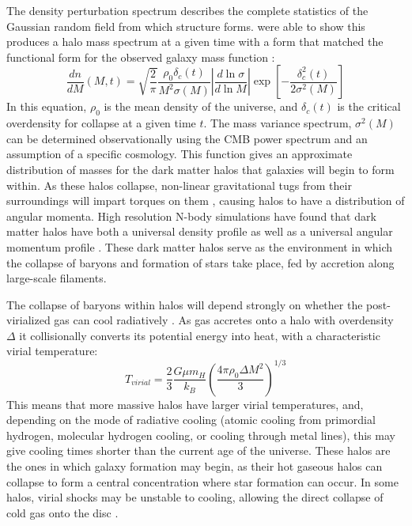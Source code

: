 The density perturbation spectrum describes the complete statistics of the
Gaussian random field from which structure forms. \citet{Press1974} were able to
show this produces a halo mass spectrum at a given time with a form that matched
the functional form for the observed galaxy mass function
\citet{Schechter1976}:
\begin{equation}
    \frac{dn}{dM}(M,t) =
    \sqrt{\frac{2}{\pi}}\frac{\rho_0\delta_c(t)}{M^2\sigma(M)} 
    \left\lvert\frac{d\ln{\sigma}}{d\ln{M}}\right\rvert
    \exp{\left[-\frac{\delta^2_c(t)}{2\sigma^2(M)}\right]}
\end{equation}
In this equation, $\rho_0$ is the mean density of the universe, and
$\delta_c(t)$ is the critical overdensity for collapse at a given time $t$.  The
mass variance spectrum, $\sigma^2(M)$ can be determined observationally using
the CMB power spectrum \citep{Fixsen1996,Spergel2003,Planck2015} and an
assumption of a specific cosmology.  This function gives an approximate
distribution of masses for the dark matter halos that galaxies will begin to
form within.  As these halos collapse, non-linear gravitational tugs from their
surroundings will impart torques on them \citep{Barnes1987}, causing halos to
have a distribution of angular momenta.  High resolution N-body simulations have
found that dark matter halos have both a universal density profile
\citep{Navarro1996,Merritt2006} as well as a universal angular momentum profile
\citep{Bullock2001}.  These dark matter halos serve as the environment in
which the collapse of baryons and formation of stars take place, fed by
accretion along large-scale filaments.

The collapse of baryons within halos will depend strongly on whether the
post-virialized gas can cool radiatively \citep{Rees1977}.  As gas accretes onto
a halo with overdensity $\Delta$ it collisionally converts its potential energy
into heat, with a characteristic virial temperature:
\begin{equation}
    T_{virial} = \frac{2}{3}\frac{G\mu m_H}{k_B}\left({\frac{4\pi\rho_0\Delta
    M^2}{3}}\right)^{1/3}
\end{equation}
This means that more massive halos have larger virial temperatures, and,
depending on the mode of radiative cooling (atomic cooling from primordial
hydrogen, molecular hydrogen cooling, or cooling through metal lines), this may
give cooling times shorter than the current age of the universe.  These halos
are the ones in which galaxy formation may begin, as their hot gaseous halos can
collapse to form a central concentration where star formation can occur.  In
some halos, virial shocks may be unstable to cooling, allowing the direct
collapse of cold gas onto the disc \citep{Birnboim2003}.  


